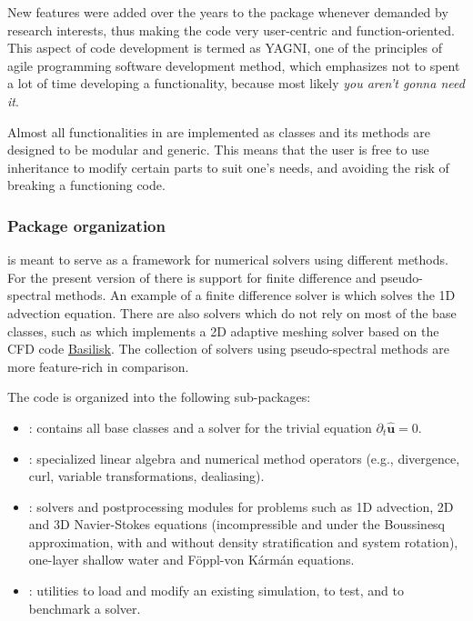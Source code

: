 \documentclass{../jors}
\begin{document}

New features were added over the years to the package whenever demanded by
research interests, thus making the code very user-centric and
function-oriented.  This aspect of code development is termed as YAGNI, one of
the principles of agile programming software development method, which
emphasizes not to spent a lot of time developing a functionality, because most
likely \emph{you aren't gonna need it}.

Almost all functionalities in  are implemented as classes and its
methods are designed to be modular and generic.  This means that the user is free
to use inheritance to modify certain parts to suit one's needs, and avoiding the
risk of breaking a functioning code.


\subsubsection*{Package organization}

 is meant to serve as a framework for numerical solvers using
different methods. For the present version of  there is support for
finite difference and pseudo-spectral methods. An example of a finite difference
solver is  which solves the 1D advection
equation. There are also solvers which do not rely on most of the base classes,
such as  which implements a 2D adaptive meshing
solver based on the CFD code \href{http://basilisk.fr/}{Basilisk}. The collection
of solvers using pseudo-spectral methods are more feature-rich in comparison.

The code is organized into the following sub-packages:

\begin{itemize}
\item {}: contains all base classes and a solver for the
trivial equation $\partial_t \mathbf{\hat{u}} = 0 $.
\item {}: specialized linear algebra and numerical
method operators (e.g., divergence, curl, variable transformations, dealiasing).

\item {}: solvers and postprocessing modules for
problems such as 1D advection, 2D and 3D Navier-Stokes equations (incompressible
and under the Boussinesq approximation, with and without density stratification
and system rotation), one-layer shallow water and F\"oppl-von K\'arm\'an
equations.

\item {}: utilities to load and modify an existing
simulation, to test, and to benchmark a solver.
\end{itemize}
\end{document}
